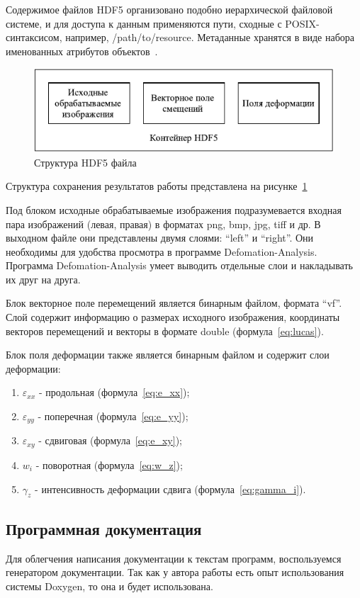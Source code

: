 Содержимое файлов HDF5 организовано подобно иерархической файловой системе, и для доступа к данным применяются пути, сходные с POSIX-синтаксисом, например, /path/to/resource. Метаданные хранятся в виде набора именованных атрибутов объектов~\cite{hdf5}.

\begin{figure}
\centering
\includegraphics[width=0.7\linewidth]{images/structHDF5.pdf}
\caption{Структура HDF5 файла}
\label{fig:structHDF5}
\end{figure}

Структура сохранения результатов работы представлена на рисунке~\ref{fig:structHDF5}

Под блоком исходные обрабатываемые изображения подразумевается входная пара изображений (левая, правая) в форматах png, bmp, jpg, tiff и др. В выходном файле они представлены двумя слоями: ``left'' и ``right''. Они необходимы для удобства просмотра в программе Defomation-Analysis. Программа Defomation-Analysis умеет выводить отдельные слои и накладывать их друг на друга.

Блок векторное поле перемещений является бинарным файлом, формата ``vf''. Слой содержит информацию о размерах исходного изображения, координаты векторов перемещений и векторы в формате double (формула~\ref{eq:lucas}).

Блок поля деформации также является бинарным файлом и содержит слои деформации:
\begin{enumerate}
\item $\varepsilon_{xx}$ - продольная (формула~\ref{eq:e_xx});
\item $\varepsilon_{yy}$ - поперечная (формула~\ref{eq:e_yy});
\item $\varepsilon_{xy}$ - сдвиговая (формула~\ref{eq:e_xy});
\item $w_{i}$ - поворотная (формула~\ref{eq:w_z});
\item $\gamma_z$ - интенсивность деформации сдвига (формула~\ref{eq:gamma_i}).
\end{enumerate}

\subsection{Программная документация}
Для облегчения написания документации к текстам программ, воспользуемся генератором документации. Так как у автора работы есть опыт использования системы Doxygen, то она и будет использована.


